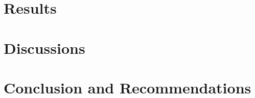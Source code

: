 \documentclass{report}
\begin{document}
\pagebreak
\chapter{Results}


\pagebreak
\chapter{Discussions}



\pagebreak
\chapter{Conclusion and Recommendations}



\pagebreak
{}
\cleardoublepage


\appendix

\cleardoublepage










\end{document}
